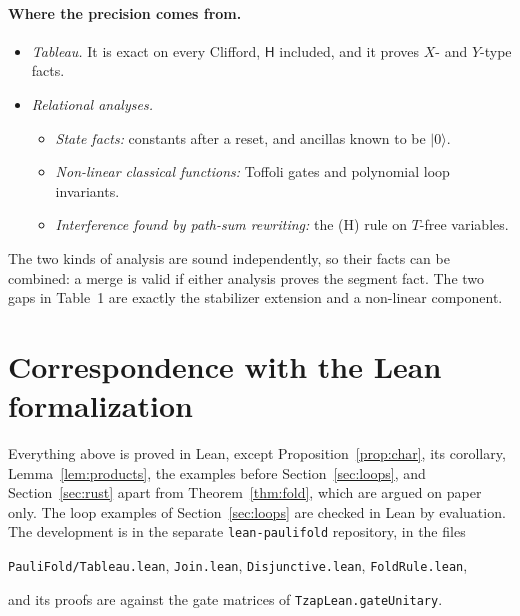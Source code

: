 \documentclass[11pt]{article}
\theoremstyle{definition}
\theoremstyle{remark}
\newcommand{\gate}[1]{\mathsf{#1}}
\begin{document}
\paragraph{Where the precision comes from.}
\begin{itemize}[nosep]
  \item \emph{Tableau.} It is exact on every Clifford, $\gate H$ included, and it proves
  $X$- and $Y$-type facts.
  \item \emph{Relational analyses.}
  \begin{itemize}[nosep]
    \item \emph{State facts:} constants after a reset, and ancillas known to be $|0\rangle$.
    \item \emph{Non-linear classical functions:} Toffoli gates and polynomial loop
    invariants.
    \item \emph{Interference found by path-sum rewriting:} the (H) rule on $T$-free
    variables.
  \end{itemize}
\end{itemize}
The two kinds of analysis are sound independently, so their facts can be combined: a merge
is valid if either analysis proves the segment fact. The two gaps in Table~1 are exactly the
stabilizer extension and a non-linear component.

\appendix
\section{Correspondence with the Lean formalization}\label{app:lean}

Everything above is proved in Lean, except Proposition~\ref{prop:char}, its corollary,
Lemma~\ref{lem:products}, the examples before Section~\ref{sec:loops}, and
Section~\ref{sec:rust} apart from Theorem~\ref{thm:fold}, which are argued on paper only. The loop examples of Section~\ref{sec:loops} are checked in Lean by evaluation.
The development is in the separate \texttt{lean-paulifold} repository, in the files
\begin{center}\texttt{PauliFold/Tableau.lean}, \quad \texttt{Join.lean}, \quad
\texttt{Disjunctive.lean}, \quad \texttt{FoldRule.lean},\end{center}
and its proofs are against the gate matrices of \texttt{TzapLean.gateUnitary}.
\end{document}
